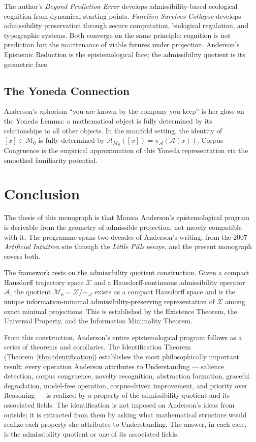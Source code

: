 \documentclass[12pt, a4paper, oneside]{book}
\newcommand{\Adm}{\mathcal{A}}
\newcommand{\X}{\mathcal{X}}
\newcommand{\M}{\mathcal{M}}
\newcommand{\projA}{\pi_{\!\Adm}}
\newcommand{\SA}{{\sim_{\!\Adm}}}
\begin{document}
The author's \emph{Beyond Prediction Error} develops admissibility-based
ecological cognition from dynamical starting points. \emph{Function
Survives Collapse} develops admissibility preservation through secure
computation, biological regulation, and typographic systems. Both converge
on the same principle: cognition is not prediction but the maintenance of
viable futures under projection. Anderson's Epistemic Reduction is the
epistemological face; the admissibility quotient is its geometric face.

\section{The Yoneda Connection}

Anderson's aphorism ``you are known by the company you keep'' is her gloss
on the Yoneda Lemma: a mathematical object is fully determined by its
relationships to all other objects. In the manifold setting, the identity
of $[x] \in \M_0$ is fully determined by $\Adm_{\M_0}([x]) =
\projA(\Adm(x))$. Corpus Congruence is the empirical approximation of
this Yoneda representation via the smoothed familiarity potential.

\chapter*{Conclusion}

The thesis of this monograph is that Monica Anderson's epistemological
program is derivable from the geometry of admissible projection, not
merely compatible with it. The programme spans two decades of Anderson's
writing, from the 2007 \emph{Artificial Intuition} site through the
\emph{Little Pills} essays, and the present monograph covers both.

The framework rests on the admissibility quotient construction. Given a
compact Hausdorff trajectory space $\X$ and a Hausdorff-continuous
admissibility operator $\Adm$, the quotient $\M_0 = \X/\SA$ exists as a
compact Hausdorff space and is the unique information-minimal
admissibility-preserving representation of $\X$ among exact minimal
projections. This is established by the Existence Theorem, the Universal
Property, and the Information Minimality Theorem.

From this construction, Anderson's entire epistemological program follows
as a series of theorems and corollaries. The Identification Theorem
(Theorem~\ref{thm:identification}) establishes the most philosophically
important result: every operation Anderson attributes to Understanding ---
salience detection, corpus congruence, novelty recognition, abstraction
formation, graceful degradation, model-free operation, corpus-driven
improvement, and priority over Reasoning --- is realized by a property
of the admissibility quotient and its associated fields. The
identification is not imposed on Anderson's ideas from outside; it is
extracted from them by asking what mathematical structure would realize
each property she attributes to Understanding. The answer, in each case,
is the admissibility quotient or one of its associated fields.
\end{document}
